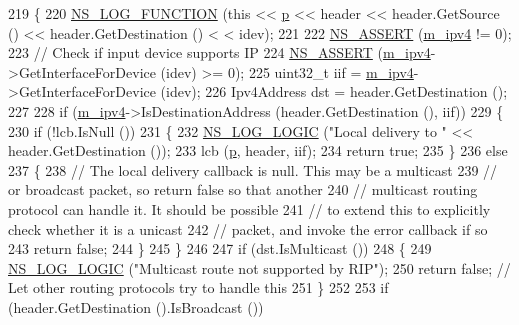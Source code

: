 \begin{DoxyCode}
219 \{
220   \hyperlink{log-macros-disabled_8h_a90b90d5bad1f39cb1b64923ea94c0761}{NS\_LOG\_FUNCTION} (\textcolor{keyword}{this} << \hyperlink{lte__link__budget_8m_ac9de518908a968428863f829398a4e62}{p} << header << header.GetSource () << header.GetDestination () <
      < idev);
221 
222   \hyperlink{assert_8h_a6dccdb0de9b252f60088ce281c49d052}{NS\_ASSERT} (\hyperlink{classns3_1_1Rip_a6e2c0e74d2fa8643d223db26621dd7f1}{m\_ipv4} != 0);
223   \textcolor{comment}{// Check if input device supports IP}
224   \hyperlink{assert_8h_a6dccdb0de9b252f60088ce281c49d052}{NS\_ASSERT} (\hyperlink{classns3_1_1Rip_a6e2c0e74d2fa8643d223db26621dd7f1}{m\_ipv4}->GetInterfaceForDevice (idev) >= 0);
225   uint32\_t iif = \hyperlink{classns3_1_1Rip_a6e2c0e74d2fa8643d223db26621dd7f1}{m\_ipv4}->GetInterfaceForDevice (idev);
226   Ipv4Address dst = header.GetDestination ();
227 
228     \textcolor{keywordflow}{if} (\hyperlink{classns3_1_1Rip_a6e2c0e74d2fa8643d223db26621dd7f1}{m\_ipv4}->IsDestinationAddress (header.GetDestination (), iif))
229     \{
230       \textcolor{keywordflow}{if} (!lcb.IsNull ())
231         \{
232           \hyperlink{group__logging_ga88acd260151caf2db9c0fc84997f45ce}{NS\_LOG\_LOGIC} (\textcolor{stringliteral}{"Local delivery to "} << header.GetDestination ());
233           lcb (\hyperlink{lte__link__budget_8m_ac9de518908a968428863f829398a4e62}{p}, header, iif);
234           \textcolor{keywordflow}{return} \textcolor{keyword}{true};
235         \}
236       \textcolor{keywordflow}{else}
237         \{
238           \textcolor{comment}{// The local delivery callback is null.  This may be a multicast}
239           \textcolor{comment}{// or broadcast packet, so return false so that another}
240           \textcolor{comment}{// multicast routing protocol can handle it.  It should be possible}
241           \textcolor{comment}{// to extend this to explicitly check whether it is a unicast}
242           \textcolor{comment}{// packet, and invoke the error callback if so}
243           \textcolor{keywordflow}{return} \textcolor{keyword}{false};
244         \}
245     \}
246 
247     \textcolor{keywordflow}{if} (dst.IsMulticast ())
248       \{
249         \hyperlink{group__logging_ga88acd260151caf2db9c0fc84997f45ce}{NS\_LOG\_LOGIC} (\textcolor{stringliteral}{"Multicast route not supported by RIP"});
250         \textcolor{keywordflow}{return} \textcolor{keyword}{false}; \textcolor{comment}{// Let other routing protocols try to handle this}
251       \}
252 
253   \textcolor{keywordflow}{if} (header.GetDestination ().IsBroadcast ())

\end{DoxyCode}
